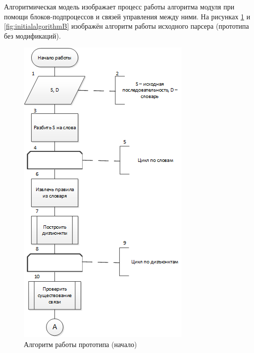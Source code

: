 Алгоритмическая модель изображает процесс работы алгоритма модуля при помощи блоков-подпроцессов и связей управления между ними. На рисунках \ref{fig:initialalgorithmA} и \ref{fig:initialalgorithmB} изображён алгоритм работы исходного парсера (прототипа без модификаций).

\begin{figure}[H]
	\centering
		\includegraphics[scale=1.0]{images/initialalgorithmA.png}
	\caption{\small Алгоритм работы прототипа (начало)}
	\label{fig:initialalgorithmA}
\end{figure}

